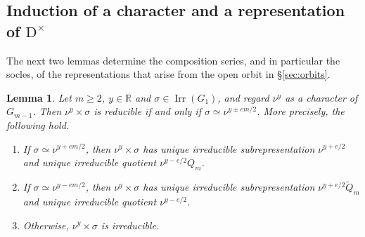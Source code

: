 \documentclass[11pt]{amsart}
\numberwithin{equation}{section}
\theoremstyle{plain}
\newtheorem{lemma}[theorem]{Lemma}
\theoremstyle{definition}
\theoremstyle{remark}
\newcommand{\R}{\mathbb{R}}
\DeclareMathOperator{\Irr}{Irr}
\newcommand{\Qt}{\widetilde{Q}}
\begin{document}
\subsection{Induction of a character and a representation of \texorpdfstring{$\mathrm{D}^\times$}{Dx}}\label{ss:char-times-sigma}

The next two lemmas determine the composition series, and in particular the socles, of the representations that arise from the open orbit in \S\ref{sec:orbits}.

\begin{lemma}\label{lem:char-sigma}
	Let $m\ge2$, $y\in\R$ and $\sigma\in\Irr(G_1)$, and regard $\nu^y$ as a character of $G_{m-1}$. Then $\nu^y\times\sigma$ is reducible if and only if $\sigma\simeq\nu^{y\pm em/2}$. More precisely, the following hold.
	\begin{enumerate}
		\item If $\sigma\simeq\nu^{y+em/2}$, then $\nu^y\times\sigma$ has unique irreducible subrepresentation $\nu^{y+e/2}$ and unique irreducible quotient $\nu^{y-e/2}Q_m$.
		\item If $\sigma\simeq\nu^{y-em/2}$, then $\nu^y\times\sigma$ has unique irreducible subrepresentation $\nu^{y+e/2}\Qt_m$ and unique irreducible quotient $\nu^{y-e/2}$.
		\item Otherwise, $\nu^y\times\sigma$ is irreducible.
	\end{enumerate}
\end{lemma}
\end{document}
